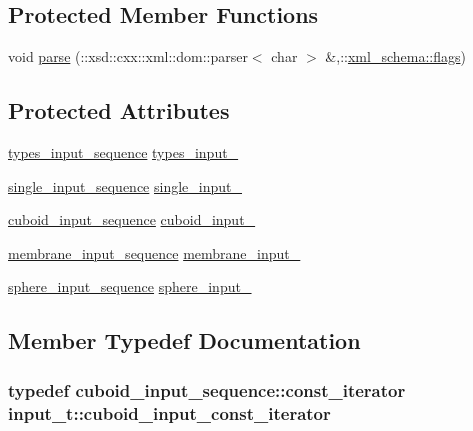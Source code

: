 \subsection*{Protected Member Functions}
\begin{DoxyCompactItemize}
\item 
void \hyperlink{classinput__t_af3861aa840c8d80dbbde88fae9b3db72}{parse} (\+::xsd\+::cxx\+::xml\+::dom\+::parser$<$ char $>$ \&,\+::\hyperlink{namespacexml__schema_a0612287d030cb2732d31a45b258fdc87}{xml\+\_\+schema\+::flags})
\end{DoxyCompactItemize}
\subsection*{Protected Attributes}
\begin{DoxyCompactItemize}
\item 
\hyperlink{classinput__t_a48f5b9f6b00c9d3749caf0e3a0eac5a7}{types\+\_\+input\+\_\+sequence} \hyperlink{classinput__t_af064e28d005941bce91337b136403cce}{types\+\_\+input\+\_\+}
\item 
\hyperlink{classinput__t_a1296075494d97da854dc2be8b1022061}{single\+\_\+input\+\_\+sequence} \hyperlink{classinput__t_a1f8f19b740102f74acb4dea4733350e4}{single\+\_\+input\+\_\+}
\item 
\hyperlink{classinput__t_a5aef33216e01e60c197cea604a519ab4}{cuboid\+\_\+input\+\_\+sequence} \hyperlink{classinput__t_af00e51fceddd64f134b3e7cd8707d692}{cuboid\+\_\+input\+\_\+}
\item 
\hyperlink{classinput__t_a455e36bc8b009abdbd13c6d167864cfe}{membrane\+\_\+input\+\_\+sequence} \hyperlink{classinput__t_a58ff5d3539fbe50257614d106dbf9dc4}{membrane\+\_\+input\+\_\+}
\item 
\hyperlink{classinput__t_aa968afe5c55f7cc3031e6196adddcae5}{sphere\+\_\+input\+\_\+sequence} \hyperlink{classinput__t_af9cafaeb8d3c98067e4a27edf2c2339e}{sphere\+\_\+input\+\_\+}
\end{DoxyCompactItemize}


\subsection{Member Typedef Documentation}
\subsubsection[{\texorpdfstring{cuboid\+\_\+input\+\_\+const\+\_\+iterator}{cuboid_input_const_iterator}}]{\setlength{\rightskip}{0pt plus 5cm}typedef cuboid\+\_\+input\+\_\+sequence\+::const\+\_\+iterator {\bf input\+\_\+t\+::cuboid\+\_\+input\+\_\+const\+\_\+iterator}}\hypertarget{classinput__t_aab1823936b590269cb0f4de2f0a0a4fa}{}\label{classinput__t_aab1823936b590269cb0f4de2f0a0a4fa}
